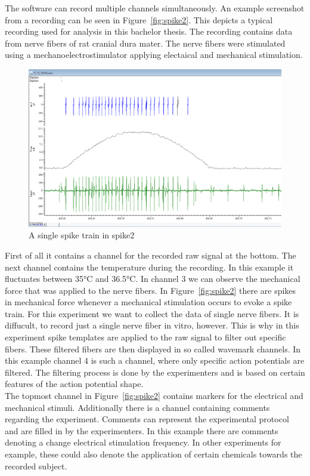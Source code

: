 The software can record multiple channels simultaneously. An example screenshot from a recording can be seen in Figure~\ref{fig:spike2}. This depicts a typical recording used for analysis in this bachelor thesis. The recording contains data from nerve fibers of rat cranial dura mater. The nerve fibers were stimulated using a mechanoelectrostimulator applying electaical and mechanical stimulation. 

\begin{figure}
	\includegraphics[width = \textwidth]{src/pic/Spike2_spike_train}
	\caption{A single spike train in spike2}
	\label{fig:spike_train}
\end{figure}

First of all it contains a channel for the recorded raw signal at the bottom. The next channel contains the temperature during the recording. In this example it fluctuates between 35°C and 36.5°C. In channel 3 we can observe the mechanical force that was applied to the nerve fibers. In Figure~\ref{fig:spike2} there are spikes in mechanical force whenever a mechanical stimulation occurs to evoke a spike train. For this experiment we want to collect the data of single nerve fibers. It is diffucult, to record just a single nerve fiber in vitro, however. This is why in this experiment spike templates are applied to the raw signal to filter out specific fibers. These filtered fibers are then displayed in so called wavemark channels. In this example channel 4 is such a channel, where only specific action potentials are filtered. The filtering process is done by the experimenters and is based on certain features of the action potential shape.\\
The topmost channel in Figure~\ref{fig:spike2} contains markers for the electrical and mechanical stimuli. Additionally there is a channel containing comments regarding the experiment. Comments can represent the experimental protocol and are filled in by the experimenters. In this example there are comments denoting a change electrical stimulation frequency. In other experiments for example, these could also denote the application of certain chemicals towards the recorded subject.

